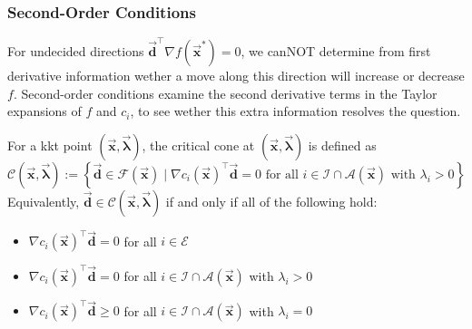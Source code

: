 \documentclass[9pt, headings=standardclasses, parskip=half]{scrartcl}
\makeatletter
\renewcommand{\emph}[1]{\textcolor{mypurple}{#1}}
\newenvironment{verticalhack}
  {\begin{array}[b]{@{}c@{}}\displaystyle}
  {\\\noalign{\hrule height0pt}\end{array}} %
\newcommand{\vect}[1]{\vec{\boldsymbol{#1}}}
\makeatother
\begin{document}

\subsubsection{Second-Order Conditions}




For undecided directions \(\vect{d}^\top \nabla f(\vect{x}^{\ast}) = 0\), we canNOT determine from first derivative information wether a move along this direction will increase or decrease \(f\).
Second-order conditions examine the second derivative terms in the Taylor expansions of \(f\) and \(c_i\), to see wether this extra information resolves the question.


\begin{definition}\label{def:critical_cone}
  For a \gls{kkt} point \( (\vect{x},\vect{\lambda}) \), the \emph{critical cone} at \((\vect{x},\vect{\lambda})\) is defined as
  \begin{equation}\label{eq:critical_cone}
    \mathcal{C}(\vect{x},\vect{\lambda}) := \left\{ \vect{d}\in\mathcal{F}(\vect{x}) \mid \nabla c_{i}(\vect{x})^{\top} \vect{d} = 0 \text{ for all } i\in\mathcal{I}\cap\mathcal{A}(\vect{x}) \text{ with } \lambda_{i}>0\right\} %
  \end{equation}
  Equivalently, \(\vect{d} \in \mathcal{C}(\vect{x},\vect{\lambda})\) if and only if all of the following hold:
  \begin{itemize}
    \item \(\nabla c_{i}(\vect{x})^{\top} \vect{d} = 0\) for all \(i\in\mathcal{E}\)
    \item  \(\nabla c_{i}(\vect{x})^{\top} \vect{d} = 0\) for all \(i\in\mathcal{I}\cap\mathcal{A}(\vect{x})\) with \(\lambda_{i}>0\)
    \item \(\nabla c_{i}(\vect{x})^{\top} \vect{d} \ge 0\) for all \(i\in\mathcal{I}\cap \mathcal{A}(\vect{x})\) with \(\lambda_{i}=0\) \qedhere
  \end{itemize}
\end{definition}
\end{document}
